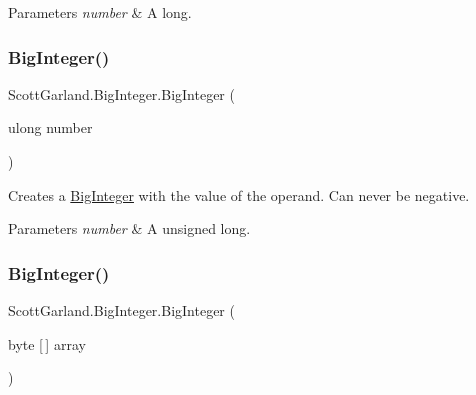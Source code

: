 \begin{DoxyParams}{Parameters}
{\em number} & A long.\\
\hline
\end{DoxyParams}
\mbox{\label{class_scott_garland_1_1_big_integer_a0ff4d1469a5c9cdb39cc6bdd0ec995b2}} 
\subsubsection{\texorpdfstring{Big\+Integer()}{BigInteger()}\hspace{0.1cm}{\footnotesize\ttfamily [3/8]}}
{\footnotesize\ttfamily Scott\+Garland.\+Big\+Integer.\+Big\+Integer (\begin{DoxyParamCaption}\item[{ulong}]{number }\end{DoxyParamCaption})\hspace{0.3cm}{\ttfamily [inline]}}



Creates a \hyperlink{class_scott_garland_1_1_big_integer}{Big\+Integer} with the value of the operand. Can never be negative. 


\begin{DoxyParams}{Parameters}
{\em number} & A unsigned long.\\
\hline
\end{DoxyParams}
\mbox{\label{class_scott_garland_1_1_big_integer_a780777418993360461e0fe7c46537860}} 
\subsubsection{\texorpdfstring{Big\+Integer()}{BigInteger()}\hspace{0.1cm}{\footnotesize\ttfamily [4/8]}}
{\footnotesize\ttfamily Scott\+Garland.\+Big\+Integer.\+Big\+Integer (\begin{DoxyParamCaption}\item[{byte \mbox{[}$\,$\mbox{]}}]{array }\end{DoxyParamCaption})\hspace{0.3cm}{\ttfamily [inline]}}



